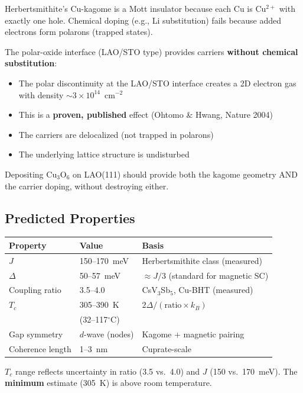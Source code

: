 \documentclass[11pt, a4paper]{article}
\begin{document}
Herbertsmithite's Cu-kagome is a Mott insulator because each Cu
is Cu$^{2+}$ with exactly one hole. Chemical doping (e.g., Li
substitution) fails because added electrons form polarons (trapped
states).

The polar-oxide interface (LAO/STO type) provides carriers
\textbf{without chemical substitution}:
\begin{itemize}[nosep]
  \item The polar discontinuity at the LAO/STO interface creates
        a 2D electron gas with density $\sim 3 \times 10^{14}$~cm$^{-2}$
  \item This is a \textbf{proven, published} effect (Ohtomo \&
        Hwang, Nature 2004)
  \item The carriers are delocalized (not trapped in polarons)
  \item The underlying lattice structure is undisturbed
\end{itemize}

Depositing Cu$_3$O$_6$ on LAO(111) should provide both the kagome
geometry AND the carrier doping, without destroying either.

\subsection{Predicted Properties}

\begin{center}
\begin{tabular}{@{}lll@{}}
\toprule
\textbf{Property} & \textbf{Value} & \textbf{Basis} \\
\midrule
$J$ & 150--170~meV & Herbertsmithite class (measured) \\
$\Delta$ & 50--57~meV & $\approx J/3$ (standard for magnetic SC) \\
Coupling ratio & 3.5--4.0 & CsV$_3$Sb$_5$, Cu-BHT (measured) \\
$T_c$ & 305--390~K & $2\Delta / (\text{ratio} \times k_B)$ \\
 & (32--117$^\circ$C) & \\
Gap symmetry & $d$-wave (nodes) & Kagome + magnetic pairing \\
Coherence length & 1--3~nm & Cuprate-scale \\
\bottomrule
\end{tabular}
\end{center}

$T_c$ range reflects uncertainty in ratio (3.5 vs.\ 4.0) and
$J$ (150 vs.\ 170~meV). The \textbf{minimum} estimate (305~K)
is above room temperature.
\end{document}
